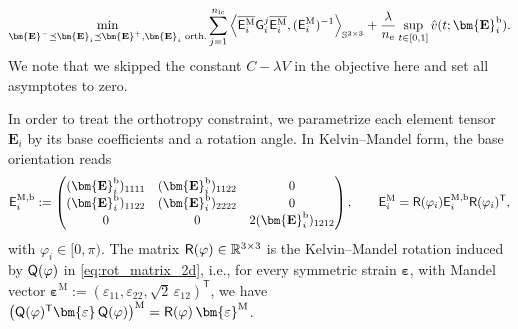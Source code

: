 \documentclass[preprint,3p]{elsarticle}
\newcommand{\tenss}[1]{\bm{\mathbf{#1}}}            %
\newcommand{\tensf}[1]{\bm{\mathbf{#1}}}            %
\newcommand{\trn}{\mathsf{T}}                       %
\newcommand{\strain}{\tenss{\varepsilon}}           %
\newcommand{\Ei}{\tensf{E}_i}                       %
\newcommand{\Emin}{\tensf{E}^{-}}                   %
\newcommand{\Emax}{\tensf{E}^{+}}                   %
\newcommand{\nel}{n_\mathrm{e}}                     %
\newcommand{\nlc}{n_\mathrm{lc}}                    %
\newcommand{\semtrx}[1]{\ifcat\noexpand#1\relax\bm{#1}\else\mathsf{#1}\fi}
\newcommand{\EiM}{\semtrx{E}_i^\mathrm{M}}          %
\newcommand{\EiMb}{\semtrx{E}_i^{\mathrm{M,b}}}  %
\begin{document}
%
\begin{equation}\label{eq:fmo_hashin_ortho_separable_lambda_i}
    \min_{\Emin \preceq \Ei \preceq \Emax, \Ei \text{ orth.}} \sum_{j=1}^{\nlc} \left\langle \overline{\EiM}\semtrx{G}_i^j\overline{\EiM}, (\EiM)^{-1}\right\rangle_{\mathbb{S}^{3\times3}} + \frac{\lambda}{\nel} \sup_{t \in [0,1]} \hat{v}(t;\Ei^{\mathrm{b}}).
\end{equation}
%
We note that we skipped the constant $C-\lambda V$ in the objective here and set all asymptotes to zero. 

In order to treat the orthotropy constraint, we parametrize each element tensor $\Ei$ by its base coefficients and a rotation angle. In Kelvin--Mandel form, the base orientation reads
%
\begin{equation}\label{eq:ortho_param}
    \EiMb :=
    \begin{pmatrix}
        (\Ei^{\mathrm{b}})_{1111} & (\Ei^{\mathrm{b}})_{1122} & 0\\
        (\Ei^{\mathrm{b}})_{1122} & (\Ei^{\mathrm{b}})_{2222} & 0\\
        0 & 0 & 2(\Ei^{\mathrm{b}})_{1212}
    \end{pmatrix},
    \qquad
    \EiM = \semtrx{R}(\varphi_i)\EiMb\semtrx{R}(\varphi_i)^\trn,
\end{equation}
%
with $\varphi_i\in[0,\pi)$. The matrix $\semtrx{R}(\varphi)\in\mathbb R^{3\times3}$ is the Kelvin--Mandel rotation induced by $\semtrx{Q}(\varphi)$ in \eqref{eq:rot_matrix_2d}, i.e., for every symmetric strain $\strain$, with Mandel vector $\strain^{\mathrm{M}}:=(\varepsilon_{11},\varepsilon_{22},\sqrt2\,\varepsilon_{12})^\trn$, we have $\big(\semtrx{Q}(\varphi)^\trn \strain\,\semtrx{Q}(\varphi)\big)^{\mathrm{M}}=\semtrx{R}(\varphi)\,\strain^{\mathrm{M}}$.
\end{document}
